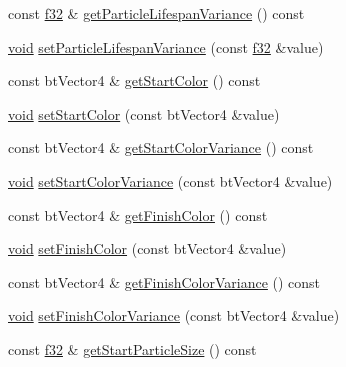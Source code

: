 \begin{DoxyCompactItemize}
\item 
const \mbox{\hyperlink{_util_8h_a5f6906312a689f27d70e9d086649d3fd}{f32}} \& \mbox{\hyperlink{classnjli_1_1_particle_emitter_a070156ef14f64708eaffc08ee51393ca}{get\+Particle\+Lifespan\+Variance}} () const
\item 
\mbox{\hyperlink{_thread_8h_af1e856da2e658414cb2456cb6f7ebc66}{void}} \mbox{\hyperlink{classnjli_1_1_particle_emitter_ab925d397a4ad73aa3177dda3ccf2174f}{set\+Particle\+Lifespan\+Variance}} (const \mbox{\hyperlink{_util_8h_a5f6906312a689f27d70e9d086649d3fd}{f32}} \&value)
\item 
const bt\+Vector4 \& \mbox{\hyperlink{classnjli_1_1_particle_emitter_a4e6efe5e81e086d81a3d6b04e0239685}{get\+Start\+Color}} () const
\item 
\mbox{\hyperlink{_thread_8h_af1e856da2e658414cb2456cb6f7ebc66}{void}} \mbox{\hyperlink{classnjli_1_1_particle_emitter_a3705b6113fafe520361e0bce816ce11a}{set\+Start\+Color}} (const bt\+Vector4 \&value)
\item 
const bt\+Vector4 \& \mbox{\hyperlink{classnjli_1_1_particle_emitter_a84f58ade0c02c1715cd5f93466f4d149}{get\+Start\+Color\+Variance}} () const
\item 
\mbox{\hyperlink{_thread_8h_af1e856da2e658414cb2456cb6f7ebc66}{void}} \mbox{\hyperlink{classnjli_1_1_particle_emitter_aa99b66eb5a2744af773ef016f86e8ad9}{set\+Start\+Color\+Variance}} (const bt\+Vector4 \&value)
\item 
const bt\+Vector4 \& \mbox{\hyperlink{classnjli_1_1_particle_emitter_a55307cfc00ce9545693c28c036182d5f}{get\+Finish\+Color}} () const
\item 
\mbox{\hyperlink{_thread_8h_af1e856da2e658414cb2456cb6f7ebc66}{void}} \mbox{\hyperlink{classnjli_1_1_particle_emitter_aaadaa67989345435f0f91135bd20659f}{set\+Finish\+Color}} (const bt\+Vector4 \&value)
\item 
const bt\+Vector4 \& \mbox{\hyperlink{classnjli_1_1_particle_emitter_a3418034b822a39c71cf4e315117bcea5}{get\+Finish\+Color\+Variance}} () const
\item 
\mbox{\hyperlink{_thread_8h_af1e856da2e658414cb2456cb6f7ebc66}{void}} \mbox{\hyperlink{classnjli_1_1_particle_emitter_a85cd1f4e3a66a351a1fd0918667cedf7}{set\+Finish\+Color\+Variance}} (const bt\+Vector4 \&value)
\item 
const \mbox{\hyperlink{_util_8h_a5f6906312a689f27d70e9d086649d3fd}{f32}} \& \mbox{\hyperlink{classnjli_1_1_particle_emitter_abf891249b166ddbe244d0d0673e0b169}{get\+Start\+Particle\+Size}} () const
\item 

\end{DoxyCompactItemize}
